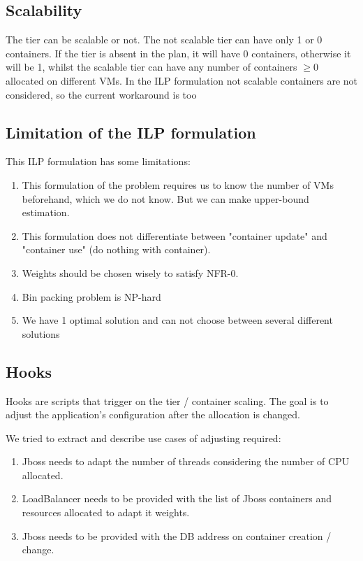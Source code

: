 \subsection{Scalability}
The tier can be scalable or not. The not scalable tier can have only 1 or 0 containers. If the tier is absent in the plan, it will have 0 containers, otherwise it will be 1, whilst the scalable tier can have any number of containers $\geq 0$ allocated on different VMs. In the ILP formulation not scalable containers are not considered, so the current workaround is too 

\subsection{Limitation of the ILP formulation}
This ILP formulation has some limitations:
\begin{enumerate}
    \item This formulation of the problem requires us to know the number of VMs beforehand, which we do not know. But we can make upper-bound estimation.
    \item This formulation does not differentiate between "container update" and "container use" (do nothing with container). 
    \item Weights should be chosen wisely to satisfy NFR-0.
    \item Bin packing problem is NP-hard
    \item We have 1 optimal solution and can not choose between several different solutions
\end{enumerate}

\subsection{Hooks}
Hooks are scripts that trigger on the tier / container scaling. The goal is to adjust the application's configuration after the allocation is changed.

We tried to extract and describe use cases of adjusting required:
\begin{enumerate}
    \item Jboss needs to adapt the number of threads considering the number of CPU allocated.
    \item LoadBalancer needs to be provided with the list of Jboss containers and resources allocated to adapt it weights.
    \item Jboss needs to be provided with the DB address on container creation / change.
\end{enumerate}

